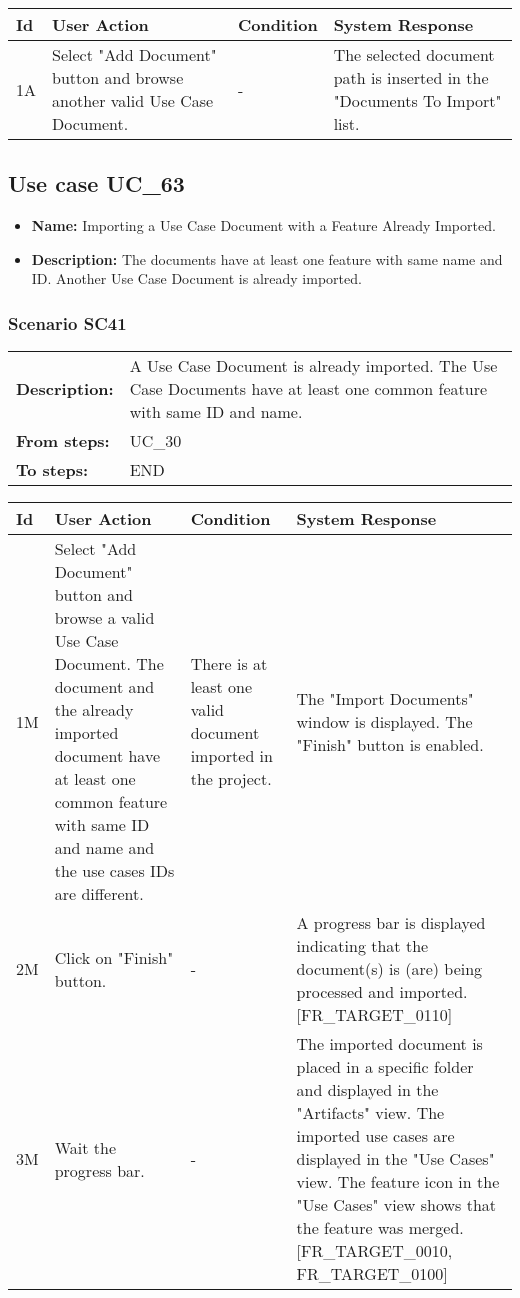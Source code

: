 \documentclass[a4paper,11pt]{article}
\newcommand{\bl}{\\ \hline}
\begin{document}
\begin{tabular}{|p{0.8in}|p{1.6in}|p{1.6in}|p{1.6in}|}
\hline
Id & User Action & Condition & System Response  \bl 
1A & Select "Add Document" button and browse another valid Use
						Case Document.  & - & The selected document path is inserted in the "Documents
						To Import" list. \bl 
\end{tabular}
\subsection*{Use case UC_63}
\begin{itemize}
\item {\bf Name: }Importing a Use Case Document with a Feature Already Imported.
			
\item {\bf Description: }The documents have at least one feature with same name
				and ID. Another Use Case Document is already imported.
\end{itemize}
\subsubsection*{Scenario SC41}
\begin{tabular}{p{1in}p{4in}}
{\bf Description:} & A Use Case Document is already imported. The Use Case
					Documents have at least one common feature with same ID and name.
				 \\
{\bf From steps:} & UC_30#2M \\
{\bf To steps:} & END \\
\end{tabular}
 
\begin{tabular}{|p{0.8in}|p{1.6in}|p{1.6in}|p{1.6in}|}
\hline
Id & User Action & Condition & System Response  \bl 
1M & Select "Add Document" button and browse a valid Use Case
						Document. The document and the already imported document have at
						least one common feature with same ID and name and the use cases
						IDs are different.  & There is at least one valid document imported in the
						project. & The "Import Documents" window is displayed. The "Finish"
						button is enabled. \bl 
2M & Click on "Finish" button. & - & A progress bar is displayed indicating that the
						document(s) is (are) being processed and imported.
						[FR_TARGET_0110]  \bl 
3M & Wait the progress bar.  & - & The imported document is placed in a specific folder and
						displayed in the "Artifacts" view. The imported use cases are
						displayed in the "Use Cases" view. The feature icon in the "Use
						Cases" view shows that the feature was merged. [FR_TARGET_0010,
						FR_TARGET_0100] \bl 
\end{tabular}
\end{document}
